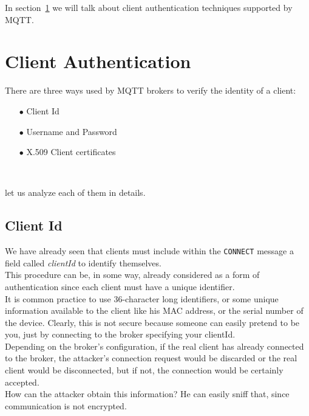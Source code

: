 \documentclass[12pt]{report}
\begin{document}
{\begin{itemize}
\end{itemize}

In section~\ref{sec:mqttclientauth} we will talk about client authentication techniques supported by MQTT.

\clearpage
\section{Client Authentication}
\label{sec:mqttclientauth}
\bigskip

There are three ways used by MQTT brokers to verify the identity of a client:

\begin{itemize}
\setlength{\itemindent}{+4mm}
  \item[$\bullet$] Client Id
  \item[$\bullet$] Username and Password
  \item[$\bullet$] X.509 Client certificates
\end{itemize}\

let us analyze each of them in details.\\


\subsection{Client Id}
\bigskip
We have already seen that clients must include within the \texttt{CONNECT} message a field called \emph{clientId} to identify themselves.\\
This procedure can be, in some way, already considered as a form of authentication since each client must have a unique identifier.\\
It is common practice to use 36-character long identifiers, or some unique information available to the client like his MAC address, or the serial number of the device.
Clearly, this is not secure because someone can easily pretend to be you, just by connecting to the broker specifying your clientId.\\
Depending on the broker's configuration, if the real client has already connected to the broker, the attacker's connection request would be discarded or the real client would be disconnected, but if not, the connection would be certainly accepted.\\

How can the attacker obtain this information? He can easily sniff that, since communication is not encrypted.\\

}
\end{document}
